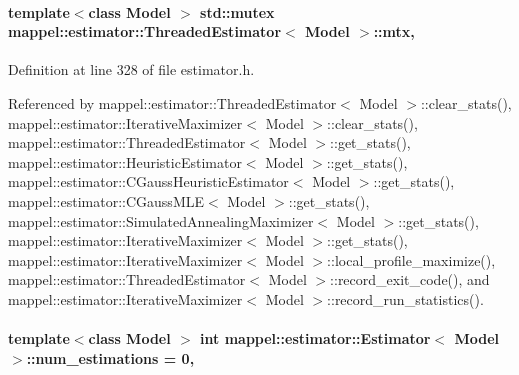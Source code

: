 \paragraph[{\texorpdfstring{mtx}{mtx}}]{\setlength{\rightskip}{0pt plus 5cm}template$<$class Model $>$ std\+::mutex {\bf mappel\+::estimator\+::\+Threaded\+Estimator}$<$ Model $>$\+::mtx\hspace{0.3cm}{\ttfamily [protected]}, {\ttfamily [inherited]}}\hypertarget{classmappel_1_1estimator_1_1ThreadedEstimator_af78695378590ff8e822dffe2b1b3f242}{}\label{classmappel_1_1estimator_1_1ThreadedEstimator_af78695378590ff8e822dffe2b1b3f242}


Definition at line 328 of file estimator.\+h.



Referenced by mappel\+::estimator\+::\+Threaded\+Estimator$<$ Model $>$\+::clear\+\_\+stats(), mappel\+::estimator\+::\+Iterative\+Maximizer$<$ Model $>$\+::clear\+\_\+stats(), mappel\+::estimator\+::\+Threaded\+Estimator$<$ Model $>$\+::get\+\_\+stats(), mappel\+::estimator\+::\+Heuristic\+Estimator$<$ Model $>$\+::get\+\_\+stats(), mappel\+::estimator\+::\+C\+Gauss\+Heuristic\+Estimator$<$ Model $>$\+::get\+\_\+stats(), mappel\+::estimator\+::\+C\+Gauss\+M\+L\+E$<$ Model $>$\+::get\+\_\+stats(), mappel\+::estimator\+::\+Simulated\+Annealing\+Maximizer$<$ Model $>$\+::get\+\_\+stats(), mappel\+::estimator\+::\+Iterative\+Maximizer$<$ Model $>$\+::get\+\_\+stats(), mappel\+::estimator\+::\+Iterative\+Maximizer$<$ Model $>$\+::local\+\_\+profile\+\_\+maximize(), mappel\+::estimator\+::\+Threaded\+Estimator$<$ Model $>$\+::record\+\_\+exit\+\_\+code(), and mappel\+::estimator\+::\+Iterative\+Maximizer$<$ Model $>$\+::record\+\_\+run\+\_\+statistics().

\paragraph[{\texorpdfstring{num\+\_\+estimations}{num_estimations}}]{\setlength{\rightskip}{0pt plus 5cm}template$<$class Model $>$ int {\bf mappel\+::estimator\+::\+Estimator}$<$ Model $>$\+::num\+\_\+estimations = 0\hspace{0.3cm}{\ttfamily [protected]}, {\ttfamily [inherited]}}\hypertarget{classmappel_1_1estimator_1_1Estimator_a9f5390f0ac3ee127ddcd90dc6f4fd889}{}\label{classmappel_1_1estimator_1_1Estimator_a9f5390f0ac3ee127ddcd90dc6f4fd889}


